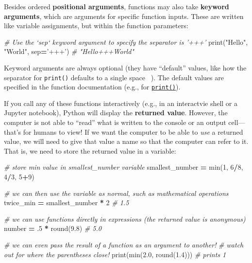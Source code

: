 \documentclass[]{book}
\newenvironment{Shaded}{\begin{snugshade}}{\end{snugshade}}
\newcommand{\DecValTok}[1]{\textcolor[rgb]{0.00,0.00,0.81}{#1}}
\newcommand{\FloatTok}[1]{\textcolor[rgb]{0.00,0.00,0.81}{#1}}
\newcommand{\StringTok}[1]{\textcolor[rgb]{0.31,0.60,0.02}{#1}}
\newcommand{\CommentTok}[1]{\textcolor[rgb]{0.56,0.35,0.01}{\textit{#1}}}
\newcommand{\OperatorTok}[1]{\textcolor[rgb]{0.81,0.36,0.00}{\textbf{#1}}}
\newcommand{\BuiltInTok}[1]{#1}
\newcommand{\NormalTok}[1]{#1}
\begin{document}
Besides ordered \textbf{positional arguments}, functions may also take
\textbf{keyword arguments}, which are arguments for specific function
inputs. These are written like variable assignments, but within the
function parameters:

\begin{Shaded}
\begin{Highlighting}[]
\CommentTok{# Use the `sep` keyword argument to specify the separator is '+++'}
\BuiltInTok{print}\NormalTok{(}\StringTok{"Hello"}\NormalTok{, }\StringTok{"World"}\NormalTok{, sep}\OperatorTok{=}\StringTok{'+++'}\NormalTok{)  }\CommentTok{# "Hello+++World"}
\end{Highlighting}
\end{Shaded}

Keyword arguments are always optional (they have ``default'' values,
like how the separator for \texttt{print()} defaults to a single space
\texttt{\textquotesingle{}\ \textquotesingle{}}). The default values are
specified in the function documentation (e.g., for
\href{https://docs.python.org/3/library/functions.html\#print}{\texttt{print()}}).

If you call any of these functions interactively (e.g., in an
interactvie shell or a Jupyter notebook), Python will display the
\textbf{returned value}. However, the computer is not able to ``read''
what is written to the console or an output cell---that's for humans to
view! If we want the computer to be able to \emph{use} a returned value,
we will need to give that value a name so that the computer can refer to
it. That is, we need to store the returned value in a variable:

\begin{Shaded}
\begin{Highlighting}[]
\CommentTok{# store min value in smallest_number variable}
\NormalTok{smallest_number }\OperatorTok{=} \BuiltInTok{min}\NormalTok{(}\DecValTok{1}\NormalTok{, }\DecValTok{6}\OperatorTok{/}\DecValTok{8}\NormalTok{, }\DecValTok{4}\OperatorTok{/}\DecValTok{3}\NormalTok{, }\DecValTok{5}\OperatorTok{+}\DecValTok{9}\NormalTok{)}

\CommentTok{# we can then use the variable as normal, such as mathematical operations}
\NormalTok{twice_min }\OperatorTok{=}\NormalTok{ smallest_number }\OperatorTok{*} \DecValTok{2}  \CommentTok{# 1.5}

\CommentTok{# we can use functions directly in expressions (the returned value is anonymous)}
\NormalTok{number }\OperatorTok{=}\NormalTok{ .}\DecValTok{5} \OperatorTok{*} \BuiltInTok{round}\NormalTok{(}\FloatTok{9.8}\NormalTok{)  }\CommentTok{# 5.0}

\CommentTok{# we can even pass the result of a function as an argument to another!}
\CommentTok{# watch out for where the parentheses close!}
\BuiltInTok{print}\NormalTok{(}\BuiltInTok{min}\NormalTok{(}\FloatTok{2.0}\NormalTok{, }\BuiltInTok{round}\NormalTok{(}\FloatTok{1.4}\NormalTok{)))  }\CommentTok{# prints 1}
\end{Highlighting}
\end{Shaded}
\end{document}
